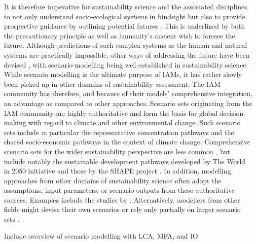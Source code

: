 \documentclass{article}
\begin{document}
\begin{refsection}
It is therefore imperative for sustainability science and the associated disciplines to not only understand socio-ecological systems in hindsight \parencite{kates_2001} but also to provide prospective guidance by outlining potential futures \parencite{swart_2004}. This is underlined by both the precautionary principle\footnotemark{} as well as humanity's ancient wish to foresee the future. Although predictions of such complex systems as the human and natural systems are practically impossible, other ways of addressing the future have been devised \parencite{polasky_2011}, with scenario-modelling being well-established in sustainability science. While scenario modelling is the ultimate purpose of IAMs, it has rather slowly been picked up in other domains of sustainability assessment. The IAM community has therefore, and because of their models' comprehensive integration, an advantage as compared to other approaches. Scenario sets originating from the IAM community are highly authoritative and form the basis for global decision-making with regard to climate and other environmental change. Such scenario sets include in particular the representative concentration pathways \parencite[RCPs;][]{vanvuuren_2011_rcp} and the shared socio-economic pathways \parencite[SSPs;][]{riahi_2017,oneill_2014} in the context of climate change. Comprehensive scenario sets for the wider sustainability perspective are less common \parencite{vansoest_2019}, but include notably the sustainable development pathways developed by The World in 2050 initiative \parencite{twi_2018} and those by the SHAPE project \parencite[e.g.][]{soergel_2021}. In addition, modelling approaches from other domains of sustainability science often adopt the assumptions, input parameters, or scenario outputs from these authoritative sources. Examples include the studies by \textcite{deetman_2018,beltran_2020,schandl_2020}. Alternatively, modellers from other fields might devise their own scenarios or rely only partially on larger scenario sets \parencite[for example][]{pauliuk_2013}.


Include overview of scenario modelling with LCA, MFA, and IO


\end{refsection}
\end{document}
